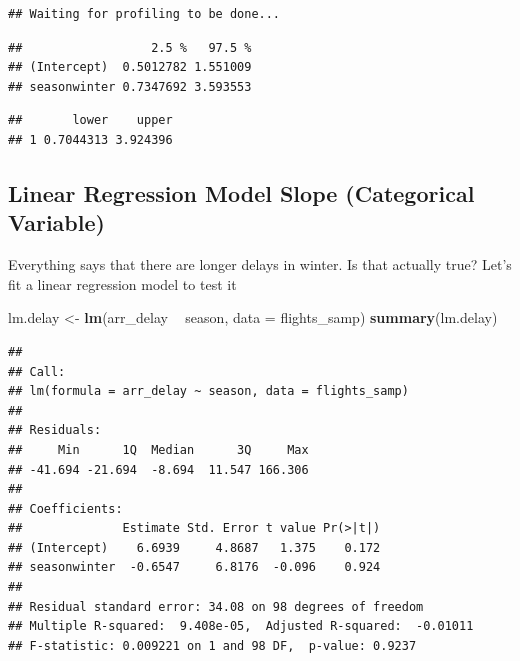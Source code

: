 \documentclass[
]{book}
\newenvironment{Shaded}{\begin{snugshade}}{\end{snugshade}}
\newcommand{\DataTypeTok}[1]{\textcolor[rgb]{0.13,0.29,0.53}{#1}}
\newcommand{\DecValTok}[1]{\textcolor[rgb]{0.00,0.00,0.81}{#1}}
\newcommand{\KeywordTok}[1]{\textcolor[rgb]{0.13,0.29,0.53}{\textbf{#1}}}
\newcommand{\NormalTok}[1]{#1}
\newcommand{\OperatorTok}[1]{\textcolor[rgb]{0.81,0.36,0.00}{\textbf{#1}}}
\newcommand{\StringTok}[1]{\textcolor[rgb]{0.31,0.60,0.02}{#1}}
\begin{document}
\begin{verbatim}
## Waiting for profiling to be done...
\end{verbatim}

\begin{verbatim}
##                  2.5 %   97.5 %
## (Intercept)  0.5012782 1.551009
## seasonwinter 0.7347692 3.593553
\end{verbatim}

\begin{Shaded}
\end{Shaded}

\begin{verbatim}
##       lower    upper
## 1 0.7044313 3.924396
\end{verbatim}

\hypertarget{linear-regression-model-slope-categorical-variable}{%
\subsection{Linear Regression Model Slope (Categorical Variable)}\label{linear-regression-model-slope-categorical-variable}}

Everything says that there are longer delays in winter. Is that actually true? Let's fit a linear regression model to test it

\begin{Shaded}
\begin{Highlighting}[]
\NormalTok{lm.delay <-}\StringTok{ }\KeywordTok{lm}\NormalTok{(arr_delay }\OperatorTok{~}\StringTok{ }\NormalTok{season, }\DataTypeTok{data =}\NormalTok{ flights_samp)}
\KeywordTok{summary}\NormalTok{(lm.delay)}
\end{Highlighting}
\end{Shaded}

\begin{verbatim}
## 
## Call:
## lm(formula = arr_delay ~ season, data = flights_samp)
## 
## Residuals:
##     Min      1Q  Median      3Q     Max 
## -41.694 -21.694  -8.694  11.547 166.306 
## 
## Coefficients:
##              Estimate Std. Error t value Pr(>|t|)
## (Intercept)    6.6939     4.8687   1.375    0.172
## seasonwinter  -0.6547     6.8176  -0.096    0.924
## 
## Residual standard error: 34.08 on 98 degrees of freedom
## Multiple R-squared:  9.408e-05,	Adjusted R-squared:  -0.01011 
## F-statistic: 0.009221 on 1 and 98 DF,  p-value: 0.9237
\end{verbatim}
\end{document}
